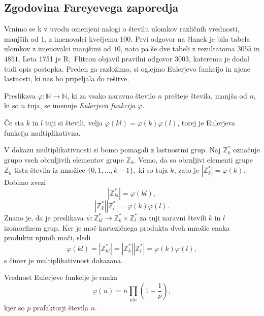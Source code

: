 \documentclass[mat1]{fmfdelo}
\begin{document}
%
\subsection{Zgodovina Fareyevega zaporedja}

Vrnimo se k v uvodu omenjeni nalogi o številu ulomkov različnih vrednosti, manjših od $1$, z imenovalci kvečjemu $100$. Prvi odgovor na članek je bila tabela ulomkov z imenovalci manjšimi od $10$, nato pa še dve tabeli z rezultatoma $3055$ in $4851$. Leta 1751 je R.~Flitcon objavil pravilni odgovor $3003$, kateremu je dodal tudi opis postopka. Preden ga razložimo, si oglejmo Eulerjevo funkcijo in njene lastnosti, ki nas bo pripeljala do rešitve. 
%

\begin{definicija}
Preslikava \( \varphi \colon \mathbb{N} \rightarrow \mathbb{N}\), ki za vsako naravno število $n$ prešteje števila, manjša od $n$, ki so $n$ tuja, se imenuje \emph{Eulerjeva funkcija} $\varphi$.
\end{definicija}

\begin{trditev}
\label{trd:MultipEuler}
Če sta $k$ in $l$ tuji si števili, velja $\varphi (kl) = \varphi (k) \varphi (l)$, torej je Eulerjeva funkcija multiplikativna.
\end{trditev}

\begin{dokaz}
V dokazu multiplikativnosti si bomo pomagali z lastnostmi grup. 
Naj $\mathbb{Z}_{k}^\ast $ označuje grupo vseh obrnljivih elementov grupe $\mathbb{Z}_{k}$. Vemo, da so obrnljivi elementi grupe $\mathbb{Z}_{k}$ tista števila iz množice \( \{0, 1, \ldots, k-1 \}, \) ki so tuja $k$, zato je $|\mathbb{Z}_{k}^\ast| = \varphi(k).$  
Dobimo zvezi
\[ |\mathbb{Z}_{kl}^\ast| = \varphi(kl), \]
\[ |\mathbb{Z}_{k}^\ast| |\mathbb{Z}_{l}^\ast| = \varphi(k) \varphi(l).\]
Znano je, da je preslikava \( \psi \colon \mathbb{Z}_{kl}^\ast \rightarrow \mathbb{Z}_{k}^\ast \times \mathbb{Z}_{l}^\ast \) za tuji naravni števili $k$ in $l$ izomorfizem grup. Ker je moč kartezičnega produkta dveh množic enaka produktu njunih moči, sledi 
\[ \varphi(kl) = |\mathbb{Z}_{kl}^\ast| = |\mathbb{Z}_{k}^\ast| |\mathbb{Z}_{l}^\ast| = \varphi(k) \varphi(l), \]
s čimer je multiplikativnost dokazana.
\end{dokaz}

\begin{trditev}
\label{trd:EulerPrastProd}
Vrednost Eulerjeve funkcije je enaka
\[ \varphi(n) = n \prod_{p|n} \left (1 - \frac{1}{p} \right ), \] kjer so $p$ prafaktorji števila $n$.
\end{trditev}
\end{document}

